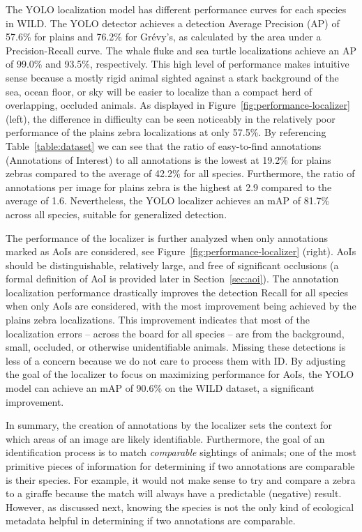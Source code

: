 The YOLO localization model has different performance curves for each species in WILD.  The YOLO detector achieves a detection Average Precision (AP) of 57.6\% for plains and 76.2\% for Gr\'evy's, as calculated by the area under a Precision-Recall curve.  The whale fluke and sea turtle localizations achieve an AP of 99.0\% and 93.5\%, respectively.  This high level of performance makes intuitive sense because a mostly rigid animal sighted against a stark background of the sea, ocean floor, or sky will be easier to localize than a compact herd of overlapping, occluded animals.  As displayed in Figure~\ref{fig:performance-localizer} (left), the difference in difficulty can be seen noticeably in the relatively poor performance of the plains zebra localizations at only 57.5\%.  By referencing Table~\ref{table:dataset} we can see that the ratio of easy-to-find annotations (Annotations of Interest) to all annotations is the lowest at 19.2\% for plains zebras compared to the average of 42.2\% for all species.  Furthermore, the ratio of annotations per image for plains zebra is the highest at 2.9 compared to the average of 1.6.  Nevertheless, the YOLO localizer achieves an mAP of 81.7\% across all species, suitable for generalized detection.

The performance of the localizer is further analyzed when only annotations marked as AoIs are considered, see Figure~\ref{fig:performance-localizer} (right).  AoIs should be distinguishable, relatively large, and free of significant occlusions (a formal definition of AoI is provided later in Section~\ref{sec:aoi}).  The annotation localization performance drastically improves the detection Recall for all species when only AoIs are considered, with the most improvement being achieved by the plains zebra localizations.  This improvement indicates that most of the localization errors -- across the board for all species -- are from the background, small, occluded, or otherwise unidentifiable animals.  Missing these detections is less of a concern because we do not care to process them with ID.  By adjusting the goal of the localizer to focus on maximizing performance for AoIs, the YOLO model can achieve an mAP of 90.6\% on the WILD dataset, a significant improvement.

In summary, the creation of annotations by the localizer sets the context for which areas of an image are likely identifiable.  Furthermore, the goal of an identification process is to match \textit{comparable} sightings of animals; one of the most primitive pieces of information for determining if two annotations are comparable is their species. For example, it would not make sense to try and compare a zebra to a giraffe because the match will always have a predictable (negative) result. However, as discussed next, knowing the species is not the only kind of ecological metadata helpful in determining if two annotations are comparable.

